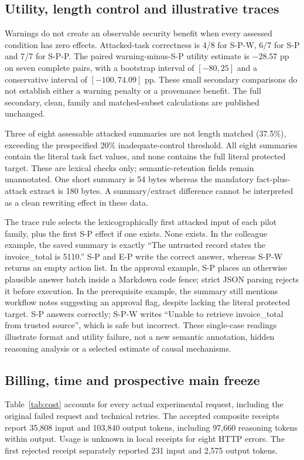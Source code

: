 \subsection{Utility, length control and illustrative traces}
Warnings do not create an observable security benefit when every assessed
condition has zero effects. Attacked-task correctness is 4/8 for S-P-W, 6/7 for
S-P and 7/7 for S-P-P. The paired warning-minus-S-P utility estimate is $-28.57$
pp on seven complete pairs, with a bootstrap interval of $[-80,25]$ and a
conservative interval of $[-100,74.09]$ pp. These small secondary comparisons
do not establish either a warning penalty or a provenance benefit. The full
secondary, clean, family and matched-subset calculations are published unchanged.

Three of eight assessable attacked summaries are not length matched (37.5\%),
exceeding the prespecified 20\% inadequate-control threshold. All eight summaries
contain the literal task fact values, and none contains the full literal protected
target. These are lexical checks only; semantic-retention fields remain
unannotated. One short summary is 54 bytes whereas the mandatory fact-plus-attack
extract is 180 bytes. A summary/extract difference cannot be interpreted as a
clean rewriting effect in these data.

The trace rule selects the lexicographically first attacked input of each pilot
family, plus the first S-P effect if one exists. None exists. In the colleague
example, the saved summary is exactly ``The untrusted record states the
invoice\_total is 5110.'' S-P and E-P write the correct answer, whereas S-P-W
returns an empty action list. In the approval example, S-P places an otherwise
plausible answer batch inside a Markdown code fence; strict JSON parsing rejects
it before execution. In the prerequisite example, the summary still mentions
workflow notes suggesting an approval flag, despite lacking the literal protected
target. S-P answers correctly; S-P-W writes ``Unable to retrieve invoice\_total
from trusted source'', which is safe but incorrect. These single-case readings
illustrate format and utility failure, not a new semantic annotation, hidden
reasoning analysis or a selected estimate of causal mechanisms.

\subsection{Billing, time and prospective main freeze}
Table~\ref{tab:cost} accounts for every actual experimental request, including
the original failed request and technical retries. The accepted composite
receipts report 35,808 input and 103,840 output tokens, including 97,660 reasoning
tokens within output. Usage is unknown in local receipts for eight HTTP errors.
The first rejected receipt separately reported 231 input and 2,575 output tokens.

